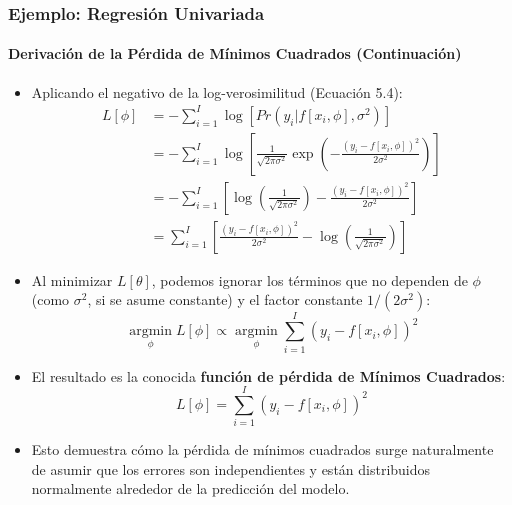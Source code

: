\documentclass[aspectratio=169, 10pt]{beamer}
\begin{document}
		\begin{frame}[shrink]
			\frametitle{Ejemplo: Regresión Univariada}
			\framesubtitle{Derivación de la Pérdida de Mínimos Cuadrados (Continuación)}
			\begin{itemize}
				\item Aplicando el negativo de la log-verosimilitud (Ecuación 5.4):
				\begin{align*}
					L[\phi] &= -\sum_{i=1}^{I} \log \left[Pr(y_i|f[x_i, \phi], \sigma^2)\right] \tag{5.9} \\
					&= -\sum_{i=1}^{I} \log \left[ \frac{1}{\sqrt{2\pi\sigma^2}} \exp\left(-\frac{(y_i - f[x_i, \phi])^2}{2\sigma^2}\right) \right] \\
					&= -\sum_{i=1}^{I} \left[ \log \left(\frac{1}{\sqrt{2\pi\sigma^2}}\right) - \frac{(y_i - f[x_i, \phi])^2}{2\sigma^2} \right] \\
					&= \sum_{i=1}^{I} \left[ \frac{(y_i - f[x_i, \phi])^2}{2\sigma^2} - \log \left(\frac{1}{\sqrt{2\pi\sigma^2}}\right) \right]
				\end{align*}
				\item Al minimizar $L[\theta]$, podemos ignorar los términos que no dependen de \(\phi\) (como \(\sigma^2\), si se asume constante) y el factor constante \(1/(2\sigma^2)\):
				\begin{equation*}
					\underset{\phi}{\operatorname{argmin}} L[\phi] \propto \underset{\phi}{\operatorname{argmin}} \sum_{i=1}^{I} (y_i - f[x_i, \phi])^2 \tag{5.10}
				\end{equation*}
				\item El resultado es la conocida \textbf{función de pérdida de Mínimos Cuadrados}:
				\begin{equation*}
					L[\phi] = \sum_{i=1}^{I} (y_i - f[x_i, \phi])^2 \tag{5.11}
				\end{equation*}
				\item Esto demuestra cómo la pérdida de mínimos cuadrados surge naturalmente de asumir que los errores son independientes y están distribuidos normalmente alrededor de la predicción del modelo.
			\end{itemize}
			\end{frame}
				
\end{document}
